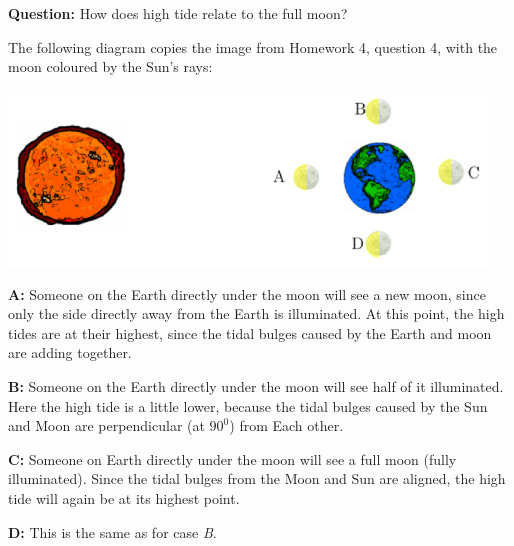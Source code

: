 \documentclass[addpoints,12pt]{exam}
\begin{document}
\noindent\textbf{Question:} How does high tide relate to the full moon?

The following diagram copies the image from Homework 4, question 4, with the moon coloured by the Sun's rays:

\begin{center}
\includegraphics[width=5in]{../images/high_tides.png}
\end{center}

\textbf{A:} Someone on the Earth directly under the moon will see a new moon, since only the side directly away from the Earth is illuminated. At this point, the high tides are at their highest, since the tidal bulges caused by the Earth and moon are adding together.

\textbf{B:} Someone on the Earth directly under the moon will see half of it illuminated. Here the high tide is a little lower, because the tidal bulges caused by the Sun and Moon are perpendicular (at $90^0$) from Each other.

\textbf{C:} Someone on Earth directly under the moon will see a full moon (fully illuminated). Since the tidal bulges from the Moon and Sun are aligned, the high tide will again be at its highest point.

\textbf{D:} This is the same as for case \textit{B}.
\end{document}
